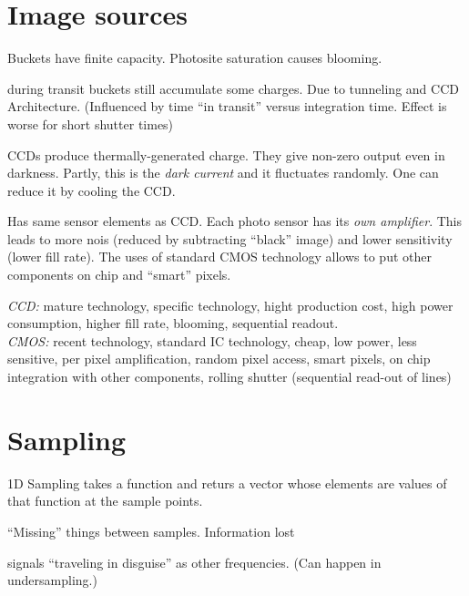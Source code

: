 \section{Image sources}
\begin{compactdesc}
	\item[\lp{digital camera (CCD)}]\hfill
	\item[\lp{analog to digital Conversion}]\hfill
	\item[\lp{Blooming}]
		Buckets have finite capacity. Photosite saturation causes blooming.
	\item[\lp{bleeding or smearing}] during transit buckets still accumulate some charges. Due to tunneling and CCD Architecture. (Influenced by time ``in transit'' versus integration time. Effect is worse for short shutter times)
	\item[\lp{dark current}] CCDs produce thermally-generated charge. They give non-zero output even in darkness. Partly, this is the \emph{dark current} and it fluctuates randomly. One can reduce it by cooling the CCD.
	\item[\lp{CMOS}] Has same sensor elements as CCD. Each photo sensor has its \emph{own amplifier}. This leads to more nois (reduced by subtracting ``black'' image) and lower sensitivity (lower fill rate). The uses of standard CMOS technology allows to put other components on chip and ``smart'' pixels.
	\item[\lp{CCD vs. CMOS}] \emph{CCD:} mature technology, specific technology, hight production cost, high power consumption, higher fill rate, blooming, sequential readout. \\\emph{CMOS:} recent technology, standard IC technology, cheap, low power, less sensitive, per pixel amplification, random pixel access, smart pixels, on chip integration with other components, rolling shutter (sequential read-out of lines)
\end{compactdesc}
\section{Sampling}
\begin{compactdesc}
	\item[1D] Sampling takes a function and returs a vector whose elements are values of that function at the sample points.
	\item[\lp{sampled representations}]\hfill
	\item[\lp{Undersampling}] ``Missing'' things between samples. Information lost
	\item[\lp{aliasing}] signals ``traveling in disguise'' as other frequencies. (Can happen in undersampling.)
\end{compactdesc}
